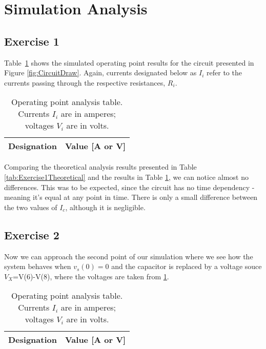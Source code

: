 \section{Simulation Analysis}
\label{sec:simulation}

\subsection{Exercise 1}

Table~\ref{tab:Exercise1Simulation} shows the simulated operating point results for the circuit presented in Figure \ref{fig:CircuitDraw}. Again, currents designated below as $I_i$ refer to the currents passing through the respective resistances, $R_i$.

\begin{table}[H]
  \centering
  \begin{tabular}{|c|c|}
    \hline    
    {\bf Designation} & {\bf Value [A or V]} \\ \hline
    
  \end{tabular}
  \caption{Operating point analysis table. Currents $I_i$ are in amperes; voltages $V_i$ are in volts.}
  \label{tab:Exercise1Simulation}
\end{table}

Comparing the theoretical analysis results presented in Table \ref{tab:Exercise1Theoretical} and the results in Table \ref{tab:Exercise1Simulation}, we can notice almost no differences. This was to be expected, since the circuit has no time dependency - meaning it's equal at any point in time. There is only a small difference between the two values of $I_c$, although it is negligible.

\subsection{Exercise 2}

Now we can approach the second point of our simulation where we see how the system behaves when $v_s(0)=0$ and the capacitor is replaced by a voltage souce $V_X$=V(6)-V(8), where the voltages are taken from \ref{tab:Exercise1Simulation}.

\begin{table}[H]
  \centering
  \begin{tabular}{|c|c|}
    \hline    
    {\bf Designation} & {\bf Value [A or V]} \\ \hline
    
  \end{tabular}
  \caption{Operating point analysis table. Currents $I_i$ are in amperes; voltages $V_i$ are in volts.}
  \label{tab:Exercise2Simulation}
\end{table}

